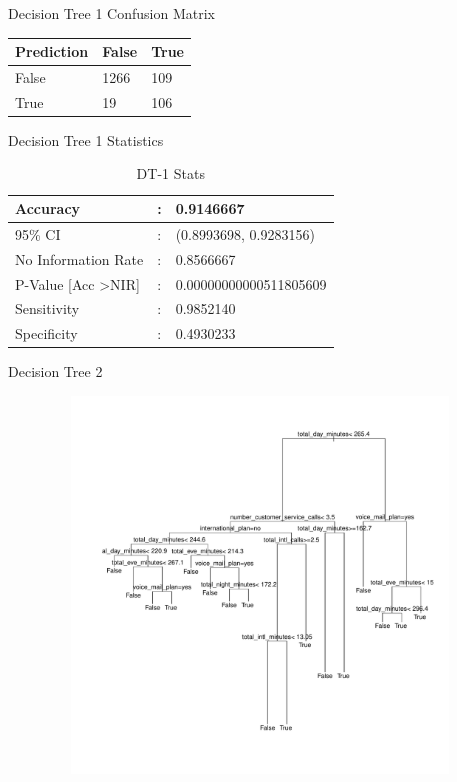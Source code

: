 \documentclass{beamer}
\begin{document}
\begin{frame}{Decision Tree 1 Confusion Matrix}
	\begin{table}
		\begin{tabular}{lll}
						\hline
						Prediction & False & True \\
						\hline
						False & 1266 & 109 \\
						\hline
						True & 19 & 106 \\
						\hline
		\end{tabular}
	\end{table}
\end{frame}

\begin{frame}{Decision Tree 1 Statistics}
	\begin{table}[]
		\centering
		\caption{DT-1 Stats}
		\label{dt-1-stats}
		\begin{tabular}{p{5cm}p{1cm}p{5cm}}
			Accuracy  & : & 0.9146667 \\
			\hline
			95\% CI   & : & (0.8993698, 0.9283156) \\ \hline
			No Information Rate  & : & 0.8566667 \\ \hline
			P-Value {[}Acc \textgreater NIR{]}  & : & 0.00000000000511805609 \\ \hline
			Sensitivity  & : & 0.9852140 \\ \hline
			Specificity  & : & 0.4930233 \\ \hline
			
		\end{tabular}
	\end{table}
\end{frame}
\begin{frame}{Decision Tree 2}
	\begin{figure}
		\hspace*{-1cm}
		\includegraphics[width=13cm,height=10cm]{ppt_figures/churnDecisionTree1}
	\end{figure}
\end{frame}
\end{document}

